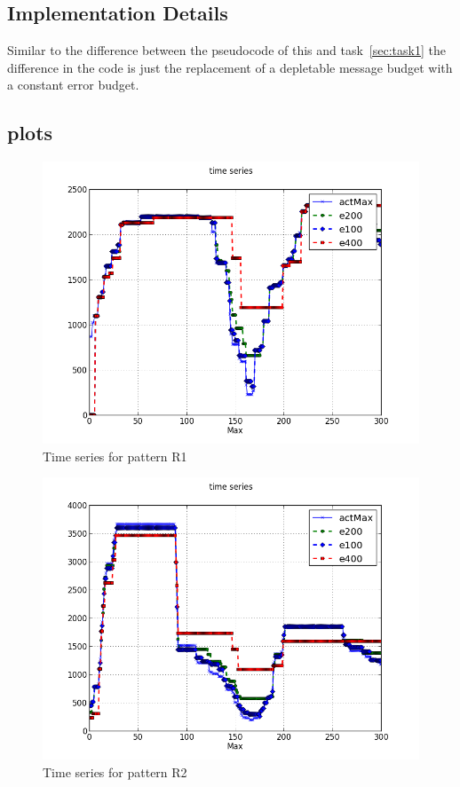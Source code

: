 \documentclass[a4paper, smallheadings,english]{scrartcl}
\begin{document}
\subsection{Implementation Details}
Similar to the difference between the pseudocode of this and task~\ref{sec:task1} the difference in the code is just the replacement of a depletable message budget with a constant error budget.

\subsection{plots}
\begin{figure}[h!]
    \begin{center}
        \includegraphics[scale=0.6]{plots/task2/time_series_R1}
    \end{center}
    \caption{Time series for pattern R1}
    \label{fig:task2_ts_r1}
\end{figure}
\begin{figure}[h!]
    \begin{center}
        \includegraphics[scale=0.6]{plots/task2/time_series_R2}
    \end{center}
    \caption{Time series for pattern R2}
    \label{fig:task2_ts_r1}
\end{figure}
\end{document}
